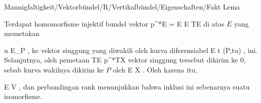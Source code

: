 {Mannigfaltigkeit/Vektorbündel/R/Vertikalbündel/Eigenschaften/Fakt}
{Lema}
{}
{

\faktzusatz {}
\faktzusatz {}

}
{

 {Terdapat homomorfisme injektif bundel vektor
\maabbdisp {} {p^*E = E \oplus E} { TE
} {}
di atas $E$ yang memetakan

\mavergleichskette
{\vergleichskette
{ u
}
{ \in }{ E_P
}
{  }{
}
{    }{
}
{   }{
}
}
{}{}{,}
ke vektor singgung yang diwakili oleh kurva diferensiabel
 {} {}
\maabbeledisp {} {\R} {E
} { t } {(P,tu)
} {,}
ini. Selanjutnya, oleh pemetaan
\maabbdisp {} {TE} { p^*TX
} {}
vektor singgung tersebut dikirim ke $0$, sebab kurva wakilnya dikirim ke $P$ oleh
 { E } { X
} {}
.
Oleh karena itu,

\mavergleichskette
{\vergleichskette
{ E
}
{ \subseteq }{ V
}
{  }{
}
{    }{
}
{   }{
}
}
{}{}{,}
dan perbandingan rank menunjukkan bahwa inklusi ini sebenarnya suatu isomorfisme.
}

}

